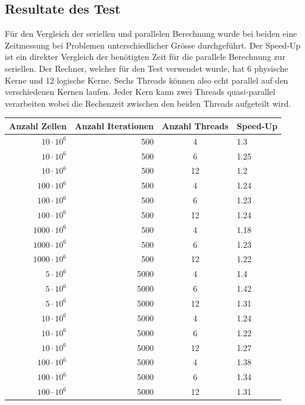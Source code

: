 \subsection{Resultate des Test
\label{parallelisierung:sub:Test}}

Für den Vergleich der seriellen und parallelen Berechnung wurde bei beiden eine Zeitmessung bei Problemen unterschiedlicher Grösse durchgeführt.
Der Speed-Up ist ein direkter Vergleich der benötigten Zeit für die parallele Berechnung zur seriellen.
Der Rechner, welcher für den Test verwendet wurde, hat 6 physische Kerne und 12 logische Kerne. 
Sechs Threads können also echt parallel auf den verschiedenen Kernen laufen.
Jeder Kern kann zwei Threads quasi-parallel verarbeiten wobei die Rechenzeit zwischen den beiden Threads aufgeteilt wird.


\begin{table}
	\centering
	\begin{tabular}{r r c l}
		Anzahl Zellen & Anzahl Iterationen & Anzahl Threads & Speed-Up \\
		\hline
		$10 \cdot 10^6$ & 500 & 4 & 1.3\\
		$10 \cdot 10^6$ & 500 & 6 & 1.25\\
		$10 \cdot 10^6$ & 500 & 12 & 1.2\\
		
		$100 \cdot 10^6$ & 500 & 4 & 1.24\\
		$100 \cdot 10^6$ & 500 & 6 & 1.23\\
		$100 \cdot 10^6$ & 500 & 12 & 1.24\\
		
		$1000 \cdot 10^6$ & 500 & 4 & 1.18\\
		$1000 \cdot 10^6$ & 500 & 6 & 1.23\\
		$1000 \cdot 10^6$ & 500 & 12 & 1.22\\
		
		
		$5 \cdot 10^6$ & 5000 & 4  & 1.4 \\
		$5 \cdot 10^6$ & 5000 & 6  & 1.42 \\
		$5 \cdot 10^6$ & 5000 & 12  & 1.31\\
		
		
		$10 \cdot 10^6$ & 5000 & 4 & 1.24\\
		$10 \cdot 10^6$ & 5000 & 6 & 1.22\\
		$10 \cdot 10^6$ & 5000 & 12 & 1.27\\
		
		$100 \cdot 10^6$ & 5000 & 4 & 1.38\\
		$100 \cdot 10^6$ & 5000 & 6 & 1.34\\
		$100 \cdot 10^6$ & 5000 & 12 & 1.31\\
		

\end{tabular}
\end{table}

